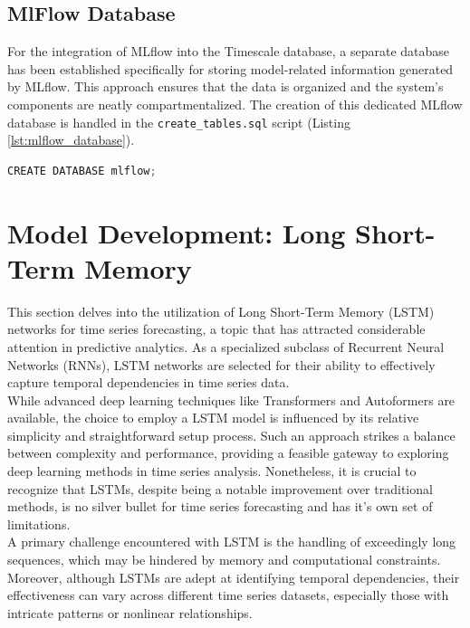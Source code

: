 \subsection{MlFlow Database}
For the integration of MLflow into the Timescale database, a separate database has been established specifically for storing model-related information generated by MLflow. This approach ensures that the data is organized and the system's components are neatly compartmentalized. The creation of this dedicated MLflow database is handled in the \texttt{create\_tables.sql} script (Listing \ref{lst:mlflow_database}).

\begin{lstlisting}[language=python, caption={Create MlFLow Datavase}, label={lst:mlflow_database}]
CREATE DATABASE mlflow;
\end{lstlisting}

\section{Model Development: Long Short-Term Memory}
\label{section:model_dev}

This section delves into the utilization of Long Short-Term Memory (LSTM) networks for time series forecasting, a topic that has attracted considerable attention in predictive analytics. As a specialized subclass of Recurrent Neural Networks (RNNs), LSTM networks are selected for their ability to effectively capture temporal dependencies in time series data. \\

While advanced deep learning techniques like Transformers and Autoformers are available, the choice to employ a LSTM model is influenced by its relative simplicity and straightforward setup process. Such an approach strikes a balance between complexity and performance, providing a feasible gateway to exploring deep learning methods in time series analysis. Nonetheless, it is crucial to recognize that LSTMs, despite being a notable improvement over traditional methods, is no silver bullet for time series forecasting and has it's own set of limitations. \\

A primary challenge encountered with LSTM is the handling of exceedingly long sequences, which may be hindered by memory and computational constraints. Moreover, although LSTMs are adept at identifying temporal dependencies, their effectiveness can vary across different time series datasets, especially those with intricate patterns or nonlinear relationships. \\

